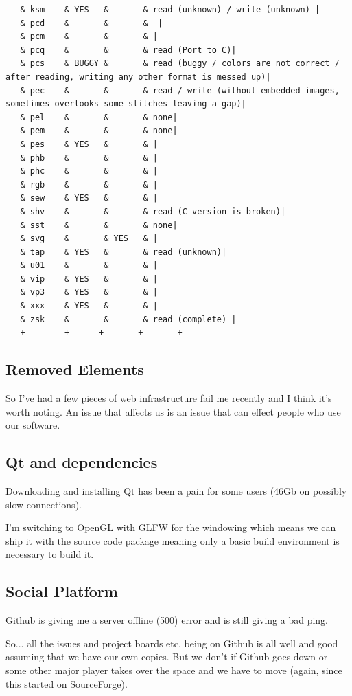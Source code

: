 \documentclass[10pt]{report}
\begin{document}
\begin{verbatim}
   & ksm    & YES   &       & read (unknown) / write (unknown) |
   & pcd    &       &       &  |
   & pcm    &       &       & |
   & pcq    &       &       & read (Port to C)|
   & pcs    & BUGGY &       & read (buggy / colors are not correct / after reading, writing any other format is messed up)|
   & pec    &       &       & read / write (without embedded images, sometimes overlooks some stitches leaving a gap)|
   & pel    &       &       & none|
   & pem    &       &       & none|
   & pes    & YES   &       & |
   & phb    &       &       & |
   & phc    &       &       & |
   & rgb    &       &       & |
   & sew    & YES   &       & |
   & shv    &       &       & read (C version is broken)|
   & sst    &       &       & none|
   & svg    &       & YES   & |
   & tap    & YES   &       & read (unknown)|
   & u01    &       &       & |
   & vip    & YES   &       & |
   & vp3    & YES   &       & |
   & xxx    & YES   &       & |
   & zsk    &       &       & read (complete) |
   +--------+------+-------+-------+
\end{verbatim}

\subsection{Removed Elements}

So I've had a few pieces of web infrastructure fail me recently and
I think it's worth noting. An issue that affects us is an issue that
can effect people who use our software.

\subsection{Qt and dependencies}

Downloading and installing Qt has been a pain for some users
(46Gb on possibly slow connections).

I'm switching to OpenGL with GLFW for the windowing which means we
can ship it with the source code package meaning only a basic build
environment is necessary to build it.

\subsection{Social Platform}

Github is giving me a server offline (500) error and is still giving a bad ping.

So... all the issues and project boards etc. being on Github is all well and good assuming that we have our own copies. But we don't if Github goes down or some other major player takes over the space and we have to move (again, since this started on SourceForge).
\end{document}
